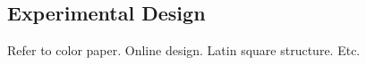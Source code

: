 \subsection{Experimental Design}
Refer to color paper. Online design. Latin square structure. Etc.


